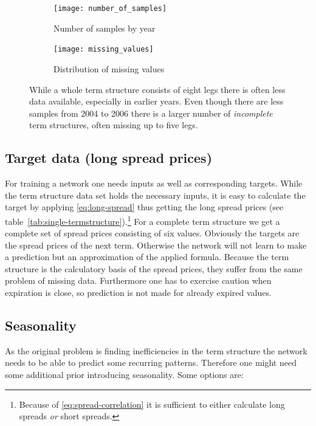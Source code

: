 \begin{figure}
		\centering
	\begin{subfigure}{0.45\linewidth}
		\texttt{[image: number\_of\_samples]}
		\caption{Number of samples by year}
		\label{fig:missing-values}
	\end{subfigure}
	\begin{subfigure}{0.45\linewidth}
		\texttt{[image: missing\_values]}
		\caption{Distribution of missing values}
		\label{fig:weekdays}
	\end{subfigure}
	\caption[Number of samples by year and distribution of missing values]{%
		While a whole term structure consists of eight legs there is often less data available, especially in earlier years. Even though there are less samples from 2004 to 2006 there is a larger number of \emph{incomplete} term structures, often missing up to five legs.}
	\label{fig:some-nice-graphics}
\end{figure}

\subsection{Target data (long spread prices)}
\label{sec:aao-target-data}

For training a network one needs inputs as well as corresponding targets. While the term structure data set holds the necessary inputs, it is easy to calculate the target by applying \eqref{eq:long-spread} thus getting the long spread prices (see table~\ref{tab:single-termstructure}).\footnote{%
	Because of \eqref{eq:spread-correlation} it is sufficient to either calculate long spreads \emph{or} short spreads.}
For a complete term structure we get a complete set of spread prices consisting of six values.
Obviously the targets are the spread prices of the next term. Otherwise the network will not learn to make a prediction but an approximation of the applied formula. Because the term structure is the calculatory basis of the spread prices, they suffer from the same problem of missing data. Furthermore one has to exercise caution when expiration is close, so prediction is not made for already expired values.

\subsection{Seasonality}
\label{sec:seasonality}

As the original problem is finding inefficiencies in the term structure the network needs to be able to predict some recurring patterns. Therefore one might need some additional prior introducing seasonality. Some options are:

